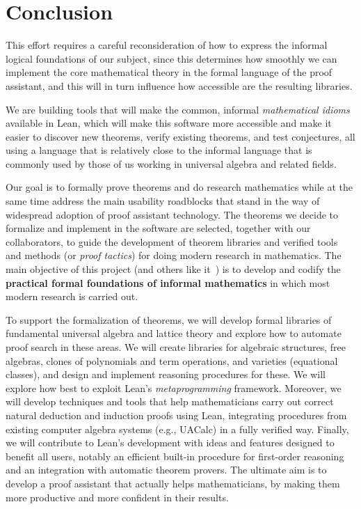 \documentclass[11pt]{amsart}  %
\begin{document}

\section{Conclusion}
This effort requires a careful reconsideration of how to express the informal 
logical foundations of our subject, since this determines how smoothly 
we can implement the core mathematical theory in the formal language of the proof assistant,
and this will in turn influence how accessible are the resulting libraries.

We are building tools that will make the common, informal \emph{mathematical idioms} available in Lean, which will make this software more accessible and make it easier to discover new theorems, verify existing theorems, and test conjectures, all using a language that is relatively close to the informal language that is commonly used by those of us working in universal algebra and related fields.

Our goal is to formally prove theorems and do research mathematics while at the same time address the main usability roadblocks that stand in the way of widespread adoption of proof assistant technology.  The theorems we decide to formalize and implement in the software are selected, together with our collaborators, to guide the development of theorem libraries and verified tools and methods (or \emph{proof tactics}) for doing modern research in mathematics.  The main objective of this project (and others like it~\cite{lean-mathlib:2018,blanchette:2018}) is to develop and codify the \textbf{practical formal foundations of informal mathematics} in which most modern research is carried out.

To support the formalization of theorems, we will develop formal libraries of fundamental universal algebra and lattice theory and explore how to automate proof search in these areas. We will create libraries for algebraic structures, free algebras, clones of polynomials and term operations, and varieties (equational classes), and design and implement reasoning procedures for these. We will explore how best to exploit Lean's \emph{metaprogramming} framework. Moreover, we will develop techniques and tools that help mathematicians carry out correct natural deduction and induction proofs using Lean, integrating procedures from existing computer algebra systems (e.g., UACalc) in a fully verified way. Finally, we will contribute to Lean's development with ideas and features designed to benefit all users, notably an efficient built-in procedure for first-order reasoning and an integration with automatic theorem provers. The ultimate aim is to develop a proof assistant that actually helps mathematicians, by making them more productive and more confident in their results.
\end{document}
